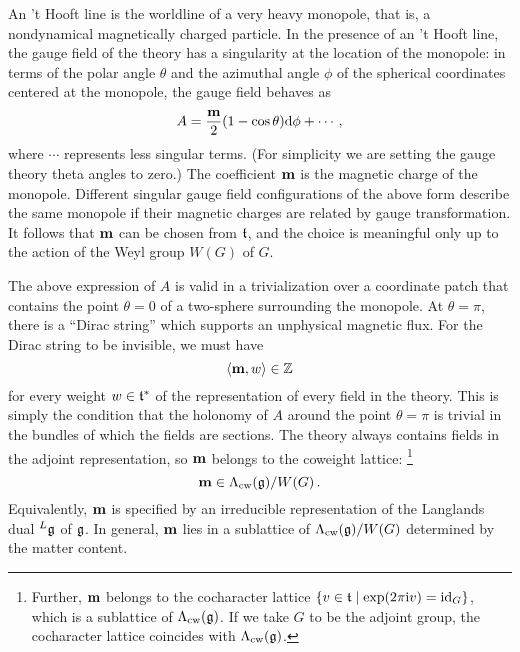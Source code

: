 An 't Hooft line is the worldline of a very heavy monopole, that is, a
nondynamical magnetically charged particle.  In the presence of an 't
Hooft line, the gauge field of the theory has a singularity at the
location of the monopole: in terms of the polar angle $\theta$ and the
azimuthal angle $\phi$ of the spherical coordinates centered at the
monopole, the gauge field behaves as
\begin{equation}
  \label{eq:monopole}
  A = \frac{\mathbf{m}}{2} (1 - \cos\theta) \mathrm{d}\phi + \dotsb \,,
\end{equation}
where $\dotsb$ represents less singular terms.  (For simplicity we are
setting the gauge theory theta angles to zero.)  The coefficient
$\mathbf{m}$ is the magnetic charge of the monopole.  Different singular
gauge field configurations of the above form describe the same
monopole if their magnetic charges are related by gauge
transformation.  It follows that $\mathbf{m}$ can be chosen from $\mathfrak{t}$,
and the choice is meaningful only up to the action of the Weyl group
$W(G)$ of $G$.

The above expression of $A$ is valid in a trivialization over a
coordinate patch that contains the point $\theta = 0$ of a two-sphere
surrounding the monopole.  At $\theta = \pi$, there is a ``Dirac
string'' which supports an unphysical magnetic flux.  For the Dirac
string to be invisible, we must have
\begin{equation}
  \langle\mathbf{m}, w\rangle \in \mathbb{Z}
\end{equation}
for every weight $w \in \mathfrak{t}^*$ of the representation of every field in
the theory.  This is simply the condition that the holonomy of $A$
around the point $\theta = \pi$ is trivial in the bundles of which the
fields are sections.  The theory always contains fields in the adjoint
representation, so $\mathbf{m}$ belongs to the coweight lattice:%
%
\footnote{Further, $\mathbf{m}$ belongs to the cocharacter lattice
  $\{v \in \mathfrak{t} \mid \exp(2\pi\mathrm{i} v) = \mathop{\mathrm{id}}\nolimits_G\}$, which is a sublattice
  of $\Lambda_{\mathrm{cw}}(\mathfrak{g})$.  If we take $G$ to be the adjoint group, the
  cocharacter lattice coincides with $\Lambda_{\mathrm{cw}}(\mathfrak{g})$.}
%
\begin{equation}
  \mathbf{m} \in \Lambda_{\mathrm{cw}}(\mathfrak{g})/W(G) \,.
\end{equation}
Equivalently, $\mathbf{m}$ is specified by an irreducible representation
of the Langlands dual ${}^L\mathfrak{g}$ of $\mathfrak{g}$.  In general, $\mathbf{m}$ lies
in a sublattice of $\Lambda_{\mathrm{cw}}(\mathfrak{g})/W(G)$ determined by the matter
content.

